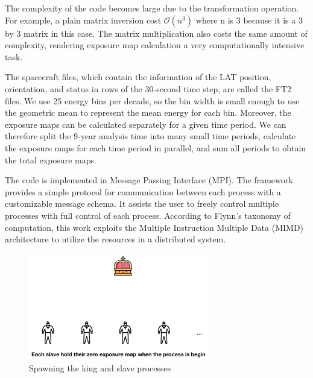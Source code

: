The complexity of 
the code becomes large due to the transformation operation.
For example, a plain matrix inversion cost $\mathcal{O}(n^3)$ where 
n is 3 because it is a 3 by 3 matrix in this case.
The matrix multiplication also costs the same amount of
complexity, rendering exposure map calculation a
very computationally intensive task.

The spacecraft files, which contain the information of the LAT
position, orientation, and status in rows of the 30-second time step,
are called the FT2 files. We use 25 energy bins per decade,
so the bin width is small enough to use the geometric mean
to represent the mean energy for each bin. 
Moreover, the exposure maps can be calculated separately
for a given time period. We can therefore split the
9-year analysis time into many small time periods,
calculate the exposure maps for each time period
in parallel, and sum all periods to obtain
the total exposure maps.

The code is implemented
in Message Passing Interface (MPI). The framework provides 
a simple protocol for communication between each process
with a customizable message schema.
It assists the user to 
freely control multiple processes with full control of 
each process. According to Flynn's taxonomy of computation,
this work exploits the Multiple Instruction Multiple Data (MIMD)
architecture to utilize the resources in a distributed system.

\begin{figure}[h!]
    \centering
    \includegraphics[width=0.7\textwidth]{content/methodology/figures/ms1_v2}
    \caption{Spawning the king and slave processes}
    \label{fig:ms1}
\end{figure}

